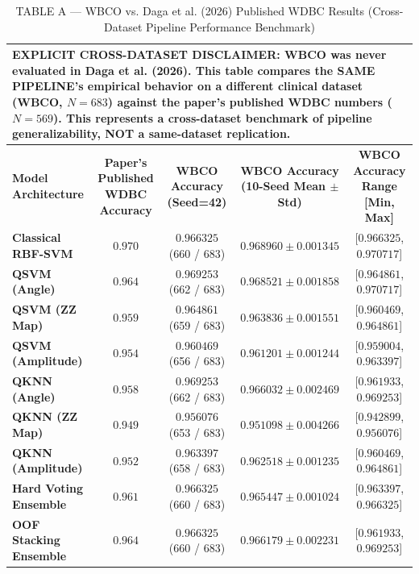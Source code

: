 \documentclass[journal,twocolumn]{IEEEtran}
\begin{document}
\begin{table}[t]
\centering
\caption{TABLE A — WBCO vs. Daga et al. (2026) Published WDBC Results (Cross-Dataset Pipeline Performance Benchmark)}
\label{tab:table_a_cross_dataset}
\footnotesize
\begin{tabularx}{\textwidth}{lcccc}
\toprule
\multicolumn{5}{p{0.96\textwidth}}{\textbf{EXPLICIT CROSS-DATASET DISCLAIMER:} WBCO was never evaluated in Daga et al. (2026). This table compares the SAME PIPELINE's empirical behavior on a different clinical dataset (WBCO, $N=683$) against the paper's published WDBC numbers ($N=569$). This represents a cross-dataset benchmark of pipeline generalizability, NOT a same-dataset replication.} \\
\midrule
\textbf{Model Architecture} & \textbf{Paper's Published WDBC Accuracy \cite{daga2026adaptive}} & \textbf{WBCO Accuracy (Seed=42)} & \textbf{WBCO Accuracy (10-Seed Mean $\pm$ Std)} & \textbf{WBCO Accuracy Range [Min, Max]} \\
\midrule
\textbf{Classical RBF-SVM} & $0.970$ & $0.966325$ (660 / 683) & $\mathbf{0.968960 \pm 0.001345}$ & [$0.966325$, $0.970717$] \\
\textbf{QSVM (Angle)} & $0.964$ & $\mathbf{0.969253}$ (662 / 683) & $\mathbf{0.968521 \pm 0.001858}$ & [$0.964861$, $0.970717$] \\
\textbf{QSVM (ZZ Map)} & $0.959$ & $0.964861$ (659 / 683) & $0.963836 \pm 0.001551$ & [$0.960469$, $0.964861$] \\
\textbf{QSVM (Amplitude)} & $0.954$ & $0.960469$ (656 / 683) & $0.961201 \pm 0.001244$ & [$0.959004$, $0.963397$] \\
\textbf{QKNN (Angle)} & $0.958$ & $\mathbf{0.969253}$ (662 / 683) & $0.966032 \pm 0.002469$ & [$0.961933$, $0.969253$] \\
\textbf{QKNN (ZZ Map)} & $0.949$ & $0.956076$ (653 / 683) & $0.951098 \pm 0.004266$ & [$0.942899$, $0.956076$] \\
\textbf{QKNN (Amplitude)} & $0.952$ & $0.963397$ (658 / 683) & $0.962518 \pm 0.001235$ & [$0.960469$, $0.964861$] \\
\textbf{Hard Voting Ensemble} & $0.961$ & $0.966325$ (660 / 683) & $0.965447 \pm 0.001024$ & [$0.963397$, $0.966325$] \\
\textbf{OOF Stacking Ensemble} & $0.964$ & $0.966325$ (660 / 683) & $0.966179 \pm 0.002231$ & [$0.961933$, $0.969253$] \\
\bottomrule
\end{tabularx}
\end{table}
\end{document}
